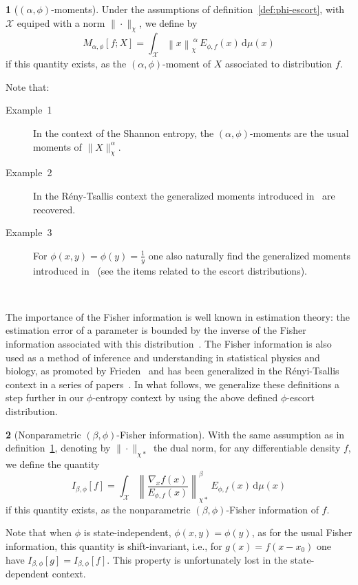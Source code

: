 \documentclass[english,sort&compress]{elsarticle}
\theoremstyle{definition}
\newtheorem{defn}{\protect\definitionname}
\theoremstyle{plain}
\theoremstyle{plain}
\providecommand{\definitionname}{Definition}
\def\dmu{\mathrm{d}\mu}
\def\X{\mathcal{X}}
\begin{document}
\begin{defn}[$(\alpha,\phi)$-moments]\label{def:phi-moment}
  Under the  assumptions of  definition~\ref{def:phi-escort}, with  $\X$ equiped
  with a norm $\| \cdot \|_\chi$, we define by
  \begin{equation}\label{eq:phi-moment}
  M_{\alpha,\phi}[f;X] = \int_\X \left\| x \right\|_\chi^{\: \alpha} \,
  E_{\phi,f}(x) \, \dmu(x)
  \end{equation}
  if this  quantity exists, as  the $(\alpha,\phi)$-moment of $X$  associated to
  distribution $f$.
\end{defn}
%
Note that:
%
\begin{description}%
\item[Example~1]    In   the    context    of   the    Shannon   entropy,    the
  $(\alpha,\phi)$-moments are the usual moments of $\|X\|_\chi^\alpha$.
%
\item[Example~2]   In  the  R\'eny-Tsallis   context  the   generalized  moments
  introduced in~\cite{TsaMen98,MarNic00} are recovered.
%
\item[Example~3] For $\phi(x,y) = \phi(y) = \frac{1}{y}$ one also naturally find
  the generalized moments  introduced in~\cite{TsaMen98,MarNic00} (see the items
  related to the escort distributions).
\end{description}


\

The importance of the Fisher information is well known in estimation theory: the
estimation  error  of a  parameter  is  bounded by  the  inverse  of the  Fisher
information  associated  with  this  distribution~\cite{Kay93,  CovTho06}.   The
Fisher information  is also used as  a method of inference  and understanding in
statistical  physics and biology,  as promoted  by Frieden~\cite{Fri04}  and has
been   generalized   in   the   R\'enyi-Tsallis   context   in   a   series   of
papers~\cite{Ham78,   ChimPen00,   CasChi02,   LutYan05,  LutLv12,   Ber12:06_1,
  Ber12:06_2, Ber13}.   In what follows,  we generalize these definitions  a step
further in our  $\phi$-entropy context by using the  above defined $\phi$-escort
distribution.

\begin{defn}[Nonparametric                                  $(\beta,\phi)$-Fisher
  information]\label{def:np-phi-Fisher}   With  the   same   assumption  as   in
  definition~\ref{def:phi-moment}, denoting  by $\|  \cdot \|_{\chi*}$  the dual
  norm, for any differentiable density $f$, we define the quantity
  \begin{equation}\label{eq:np-phi-Fisher}
    I_{\beta,\phi}[f] = \int_\X \left\| \frac{\nabla_x f(x)}{E_{\phi,f}(x)}
    \right\|_{\chi*}^\beta \, E_{\phi,f}(x) \, \dmu(x)
  \end{equation}
  if   this  quantity   exists,  as   the   nonparametric  $(\beta,\phi)$-Fisher
  information of $f$.
\end{defn}
%
Note that  when $\phi$ is state-independent,  $\phi(x,y) = \phi(y)$,  as for the
usual Fisher information,  this quantity is shift-invariant, i.e.,  for $g(x) =
f(x-x_0)$  one have  $I_{\beta,\phi}[g] =  I_{\beta,\phi}[f]$. This  property is
unfortunately lost in the state-dependent context.
\end{document}
